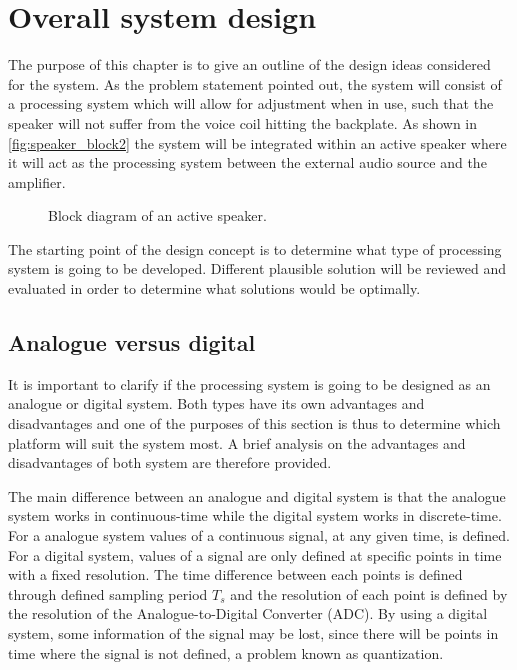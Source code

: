 \chapter{Overall system design}
The purpose of this chapter is to give an outline of the design ideas considered for the system. As the problem statement pointed out, the system will consist of a processing system which will allow for adjustment when in use, such that the speaker will not suffer from the voice coil hitting the backplate. As shown in \autoref{fig:speaker_block2} the system will be integrated within an active speaker where it will act as the processing system between the external audio source and the amplifier.

\begin{figure}[H]
\centering
{}
\scalebox{0.9}{
}
\caption{Block diagram of an active speaker.}
\label{fig:speaker_block2}
\end{figure}

The starting point of the design concept is to determine what type of processing system is going to be developed. Different plausible solution will be reviewed and evaluated in order to determine what solutions would be optimally. 


\section{Analogue versus digital}
It is important to clarify if the processing system is going to be designed as an analogue or digital system. Both types have its own advantages and disadvantages and one of the purposes of this section is thus to determine which platform will suit the system most. A brief analysis on the advantages and disadvantages of both system are therefore provided. 

The main difference between an analogue and digital system is that the analogue system works in continuous-time while the digital system works in discrete-time. For a analogue system values of a continuous signal, at any given time, is defined. For a digital system, values of a signal are only defined at specific points in time with a fixed resolution. The time difference between each points is defined through defined sampling period $T_s$ and the resolution of each point is defined by the resolution of the Analogue-to-Digital Converter (ADC). By using a digital system, some information of the signal may be lost, since there will be points in time where the signal is not defined, a problem known as quantization.

